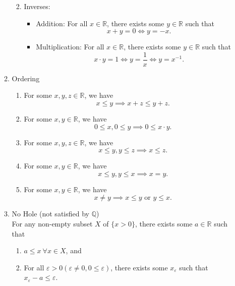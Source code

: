 \documentclass{article}
\newcommand{\Q}{\mathbb{Q}}
\newcommand{\R}{\mathbb{R}}
\newcommand{\?}{\stackrel{?}{=}}
\newcommand{\smallblacksquare}{\rule{0.5em}{0.5em}}
\theoremstyle{definition} %
\begin{document}
\begin{itemize}
\begin{enumerate}[label=\Roman*]
\begin{enumerate}[label=(\roman*)]
\begin{itemize}[label=$\smallblacksquare$]
                              \end{itemize}
                        \item Inverses:
                              \begin{itemize}[label=$\smallblacksquare$]
                                  \item Addition: For all $x \in \R$, there exists some $y \in \R$ such that
                                        $$x + y = 0 \iff y = -x.$$
                                  \item Multiplication: For all $x \in \R$, there exists some $y \in \R$ such that
                                        $$x \cdot y = 1 \iff y = \frac{1}{x} \iff y = x^{-1}.$$
                              \end{itemize}
                    \end{enumerate}
              \item Ordering
                    \begin{enumerate}[label=(\roman*)]
                        \item For some $x, y, z \in \R$, we have
                              $$x \leq y \implies x + z \leq y + z.$$
                        \item For some $x, y \in \R$, we have
                              $$0 \leq x, 0 \leq y \implies 0 \leq x \cdot y.$$
                        \item For some $x, y, z \in \R$, we have
                              $$x \leq y, y \leq z \implies x \leq z.$$
                        \item For some $x, y \in \R$, we have
                              $$x \leq y, y \leq x \implies x = y.$$
                        \item For some $x, y \in \R$, we have
                              $$x \neq y \implies x \leq y \text{ or } y \leq x.$$
                    \end{enumerate}
              \item No Hole (not satisfied by $\Q$) \\
                    For any non-empty subset $X$ of $\{x > 0\}$, there exists some $a \in \R$ such that
                    \begin{enumerate}[label=(\arabic*)]
                        \item $a \leq x \ \forall x \in X$, and
                        \item For all $\varepsilon > 0 (\varepsilon \neq 0, 0 \leq \varepsilon)$, there exists some $x_\varepsilon$ such that $x_\varepsilon - a \leq \varepsilon$.
                    \end{enumerate}
          \end{enumerate}
\end{itemize}
\end{document}
